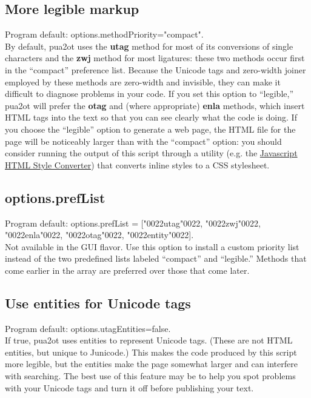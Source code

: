 \documentclass[12pt,letterpaper,openany]{article}
\newcommand\textSourceText[1]{{\color{GGOrange}\textsf{#1}}}
\newcommand{\pto}{\textsf{\color{myLightPurple}pua2ot}}
\begin{document}
\subsection{More legible markup}

Program default: \textSourceText{options.methodPriority="compact"}.\\
By default, {\pto} uses the \textbf{utag} method for most of its 
conversions of single characters and the \textbf{zwj} method for most ligatures: these 
two methods occur first in the “compact” preference list. Because the Unicode tags and
zero-width joiner employed by these methods are zero-width and invisible, they can
make it difficult to diagnose problems in your code. If you set this option to 
“legible,” {\pto} will prefer the \textbf{otag} and (where appropriate) \textbf{enla} 
methods, which insert HTML tags into the text so that you can see clearly what the code 
is doing. If you choose the “legible” option to generate a web page, the HTML file 
for the page will be noticeably larger than with the “compact” option: you should 
consider running the output of this script through a utility (e.g. the 
\href{https://www.npmjs.com/package/html-style-converter}{Javascript HTML Style 
Converter}) that converts inline styles to a CSS stylesheet.

\subsection{options.prefList}

Program default: \textSourceText{options.prefList = [\char"0022utag\char"0022, \char"0022zwj\char"0022,
\char"0022enla\char"0022, \char"0022otag\char"0022, \char"0022entity\char"0022]}.\\
Not available in the GUI flavor. Use this option to install a custom priority 
list instead of the two predefined lists labeled “compact” and “legible.”
Methods that come earlier in the array are preferred over those that come later.

\subsection{Use entities for Unicode tags}

Program default: \textSourceText{options.utagEntities=false}.\\
If \textSourceText{true}, {\pto} uses entities to represent Unicode tags. (These are not 
HTML entities, but unique to Junicode.) This makes the code produced by this script more 
legible, but the entities make the page somewhat larger and can interfere with searching.
The best use of this feature may be to help you spot problems with your Unicode tags
and turn it off before publishing your text.
\end{document}
